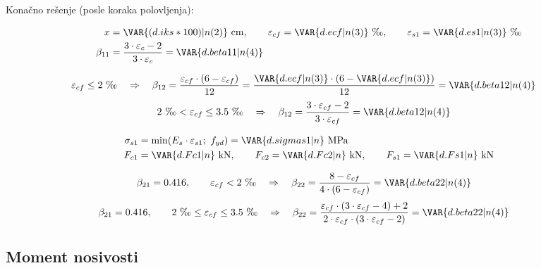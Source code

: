 Konačno rešenje (posle  koraka polovljenja):

\begin{align*}
x &= \VAR{(d.iks*100)|n(2)} \ \mathrm{cm}, \qquad \varepsilon_{cf} = \VAR{d.ecf|n(3)} \ \text{‰}, \qquad \varepsilon_{s1} = \VAR{d.es1|n(3)} \ \text{‰} \\
\beta_{11} &= \frac{3 \cdot \varepsilon_c - 2}{3 \cdot \varepsilon_c} = \VAR{d.beta11|n(4)}
\end{align*}

\begin{align*}
\varepsilon_{cf} &\leq 2 \ \text{‰} \quad \Rightarrow \quad \beta_{12} = \frac{\varepsilon_{cf} \cdot (6 - \varepsilon_{cf})}{12} = \frac{\VAR{d.ecf|n(3)} \cdot (6 - \VAR{d.ecf|n(3)})}{12} = \VAR{d.beta12|n(4)}
\end{align*}
\begin{align*}
2 \ \text{‰} &< \varepsilon_{cf} \leq 3.5 \ \text{‰} \quad \Rightarrow \quad \beta_{12} = \frac{3 \cdot \varepsilon_{cf} - 2}{3 \cdot \varepsilon_{cf}} = \VAR{d.beta12|n(4)}
\end{align*}

\begin{align*}
\sigma_{s1} &= \min(E_s \cdot \varepsilon_{s1};\ f_{yd}) = \VAR{d.sigmas1|n} \ \mathrm{MPa} \\
F_{c1} &= \VAR{d.Fc1|n} \ \mathrm{kN}, \qquad F_{c2} = \VAR{d.Fc2|n} \ \mathrm{kN}, \qquad F_{s1} = \VAR{d.Fs1|n} \ \mathrm{kN}
\end{align*}

\begin{align*}
\beta_{21} &= 0.416, \qquad \varepsilon_{cf} < 2 \ \text{‰} \quad \Rightarrow \quad \beta_{22} = \frac{8 - \varepsilon_{cf}}{4 \cdot (6 - \varepsilon_{cf})} = \VAR{d.beta22|n(4)}
\end{align*}
\begin{align*}
\beta_{21} &= 0.416, \qquad 2 \ \text{‰} \leq \varepsilon_{cf} \leq 3.5 \ \text{‰} \quad \Rightarrow \quad \beta_{22} = \frac{\varepsilon_{cf} \cdot (3 \cdot \varepsilon_{cf} - 4) + 2}{2 \cdot \varepsilon_{cf} \cdot (3 \cdot \varepsilon_{cf} - 2)} = \VAR{d.beta22|n(4)}
\end{align*}

\subsection{Moment nosivosti}

